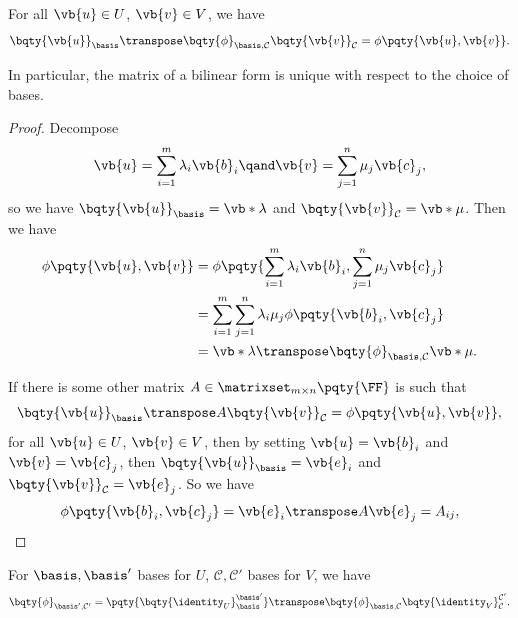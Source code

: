 \begin{proposition}
    \label{prop:compatibility-bilinear-forms-component-vectors}%
    For all \(\vb{u} \in U\), \(\vb{v} \in V\), we have
    \[
        \bqty{\vb{u}}_{\basis}\transpose \bqty{\phi}_{\basis, \mathcal{C}} \bqty{\vb{v}}_{\mathcal{C}} = \phi\pqty{\vb{u}, \vb{v}}.
    \]

    In particular, the matrix of a bilinear form is unique with respect to the choice of bases.
\end{proposition}

\begin{proof}
    Decompose
    \[
        \vb{u} = \sum_{i=1}^m \lambda_i \vb{b}_i \qand \vb{v} = \sum_{j=1}^n \mu_j \vb{c}_j,
    \]
    so we have \(\bqty{\vb{u}}_{\basis} = \vb*{\lambda}\) and \(\bqty{\vb{v}}_{\mathcal{C}} = \vb*{\mu}\). Then we have
    \begin{align*}
        \phi\pqty{\vb{u}, \vb{v}} &= \phi\pqty{\sum_{i=1}^m \lambda_i \vb{b}_i, \sum_{j=1}^n \mu_j \vb{c}_j} \\
        &= \sum_{i = 1}^{m} \sum_{j = 1}^{n} \lambda_i \mu_j \phi\pqty{\vb{b}_i, \vb{c}_j} \\
        &= \vb*{\lambda}\transpose \bqty{\phi}_{\basis, \mathcal{C}} \vb*{\mu}.
    \end{align*}

    If there is some other matrix \(A \in \matrixset_{m \times n} \pqty{\FF}\) is such that
    \[
        \bqty{\vb{u}}_{\basis}\transpose A \bqty{\vb{v}}_{\mathcal{C}} = \phi\pqty{\vb{u}, \vb{v}},
    \]
    for all \(\vb{u} \in U\), \(\vb{v} \in V\), then by setting \(\vb{u} = \vb{b}_i\) and \(\vb{v} = \vb{c}_j\), then \(\bqty{\vb{u}}_{\basis} = \vb{e}_i\) and \(\bqty{\vb{v}}_{\mathcal{C}} = \vb{e}_j\). So we have
    \[
        \phi\pqty{\vb{b}_i, \vb{c}_j} = \vb{e}_i\transpose A \vb{e}_j = A_{ij},
    \]
\end{proof}

\begin{corollary}
    \label{cor:change-of-basis-bilinear-forms}%
    For \(\basis, \basis'\) bases for \(U\), \(\mathcal{C}, \mathcal{C}'\) bases for \(V\), we have
    \[
        \bqty{\phi}_{\basis', \mathcal{C}'} = \pqty{\bqty{\identity_{U}}_{\basis}^{\basis'}}\transpose \bqty{\phi}_{\basis, \mathcal{C}} \bqty{\identity_{V}}_{\mathcal{C}}^{\mathcal{C}'}.
    \]
\end{corollary}

